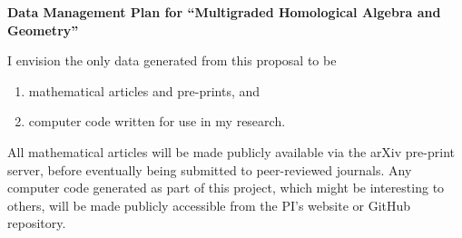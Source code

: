 \documentclass[12pt]{amsart}
\begin{document}
\begin{center}
\textbf{Data Management Plan for ``Multigraded Homological Algebra and Geometry''}
\end{center}

\vspace{1cm}
I envision the only data generated from this proposal to be 
\begin{enumerate}
	\item mathematical articles and pre-prints, and
	\item computer code written for use in my research.
\end{enumerate}
All mathematical articles will be made publicly available via the arXiv pre-print server, before eventually being submitted to peer-reviewed journals.  Any computer code generated as part of this project, which might be interesting to others, will be made publicly accessible from the PI's website or GitHub repository. 

 \pagestyle{empty}
\end{document}
